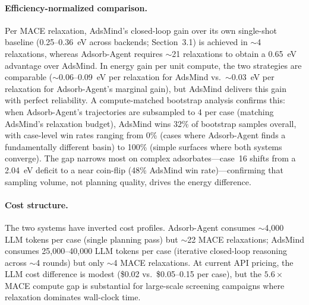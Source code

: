 \paragraph{Efficiency-normalized comparison.}
Per MACE relaxation, AdsMind's closed-loop gain over its own single-shot baseline (0.25--0.36~eV across backends; Section~3.1) is achieved in $\sim$4 relaxations, whereas Adsorb-Agent requires $\sim$21 relaxations to obtain a 0.65~eV advantage over AdsMind.
In energy gain per unit compute, the two strategies are comparable ($\sim$0.06--0.09~eV per relaxation for AdsMind vs.\ $\sim$0.03~eV per relaxation for Adsorb-Agent's marginal gain), but AdsMind delivers this gain with perfect reliability.
A compute-matched bootstrap analysis confirms this: when Adsorb-Agent's trajectories are subsampled to 4 per case (matching AdsMind's relaxation budget), AdsMind wins 32\% of bootstrap samples overall, with case-level win rates ranging from 0\% (cases where Adsorb-Agent finds a fundamentally different basin) to 100\% (simple surfaces where both systems converge).
The gap narrows most on complex adsorbates---case~16 shifts from a 2.04~eV deficit to a near coin-flip (48\% AdsMind win rate)---confirming that sampling volume, not planning quality, drives the energy difference.

\paragraph{Cost structure.}
The two systems have inverted cost profiles.
Adsorb-Agent consumes $\sim$4{,}000 LLM tokens per case (single planning pass) but $\sim$22 MACE relaxations; AdsMind consumes 25{,}000--40{,}000 LLM tokens per case (iterative closed-loop reasoning across $\sim$4 rounds) but only $\sim$4 MACE relaxations.
At current API pricing, the LLM cost difference is modest (\$0.02 vs.\ \$0.05--0.15 per case), but the $5.6\times$ MACE compute gap is substantial for large-scale screening campaigns where relaxation dominates wall-clock time.

